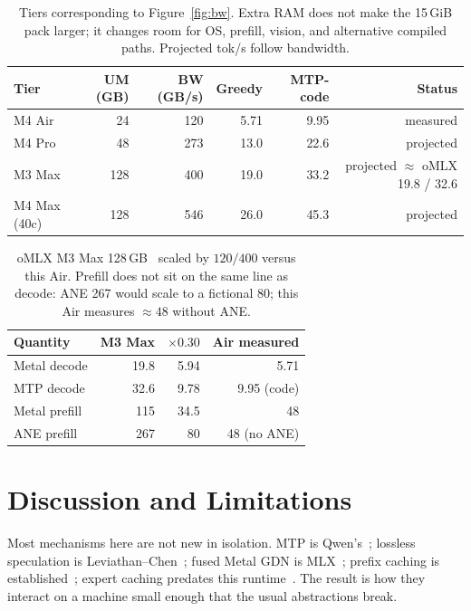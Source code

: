 \begin{table}[t]
\centering
\caption{Tiers corresponding to Figure~\ref{fig:bw}. Extra RAM does not make the 15\,GiB pack larger; it changes room for OS, prefill, vision, and alternative compiled paths. Projected tok/s follow bandwidth.}
\label{tab:proj}
\small
\begin{tabular}{@{}lrrrrr@{}}
\toprule
Tier & UM (GB) & BW (GB/s) & Greedy & MTP-code & Status \\
\midrule
M4 Air & 24 & 120 & 5.71 & 9.95 & measured \\
M4 Pro & 48 & 273 & 13.0 & 22.6 & projected \\
M3 Max & 128 & 400 & 19.0 & 33.2 & projected ${\approx}$ oMLX 19.8 / 32.6 \\
M4 Max (40c) & 128 & 546 & 26.0 & 45.3 & projected \\
\bottomrule
\end{tabular}
\end{table}

\begin{table}[t]
\centering
\caption{oMLX M3 Max 128\,GB~\citep{omlx2874} scaled by $120/400$ versus this Air. Prefill does not sit on the same line as decode: ANE 267 would scale to a fictional 80; this Air measures ${\approx}48$ without ANE.}
\label{tab:scale}
\small
\begin{tabular}{@{}lrrr@{}}
\toprule
Quantity & M3 Max & ${\times}0.30$ & Air measured \\
\midrule
Metal decode & 19.8 & 5.94 & 5.71 \\
MTP decode & 32.6 & 9.78 & 9.95 (code) \\
Metal prefill & 115 & 34.5 & 48 \\
ANE prefill & 267 & 80 & 48 (no ANE) \\
\bottomrule
\end{tabular}
\end{table}

\FloatBarrier

\section{Discussion and Limitations}
\label{sec:discuss}

Most mechanisms here are not new in isolation. MTP is Qwen’s~\citep{qwen3}; lossless speculation is Leviathan--Chen~\citep{leviathan2023speculative,chen2023accelerating}; fused Metal GDN is MLX~\citep{mlx2023,mlxlm}; prefix caching is established~\citep{zheng2024sglang}; expert caching predates this runtime~\citep{rajbhandari2022deepspeed,he2022fastermoe}. The result is how they interact on a machine small enough that the usual abstractions break.

